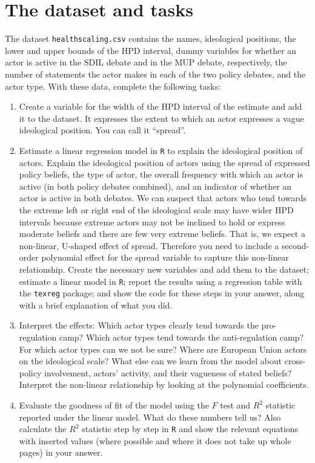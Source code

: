 \documentclass[a4paper,11pt]{article}
\begin{document}
\section*{The dataset and tasks}
The dataset \texttt{healthscaling.csv} contains the names, ideological positions, the lower and upper bounds of the HPD interval, dummy variables for whether an actor is active in the SDIL debate and in the MUP debate, respectively, the number of statements the actor makes in each of the two policy debates, and the actor type. With these data, complete the following tasks:

\begin{enumerate}
 \item Create a variable for the width of the HPD interval of the estimate and add it to the dataset. It expresses the extent to which an actor expresses a vague ideological position. You can call it ``spread''.
 \item Estimate a linear regression model in \texttt{R} to explain the ideological position of actors. Explain the ideological position of actors using the spread of expressed policy beliefs, the type of actor, the overall frequency with which an actor is active (in both policy debates combined), and an indicator of whether an actor is active in both debates. We can suspect that actors who tend towards the extreme left or right end of the ideological scale may have wider HPD intervals because extreme actors may not be inclined to hold or express moderate beliefs and there are few very extreme beliefs. That is, we expect a non-linear, U-shaped effect of spread. Therefore you need to include a second-order polynomial effect for the spread variable to capture this non-linear relationship. Create the necessary new variables and add them to the dataset; estimate a linear model in \texttt{R}; report the results using a regression table with the \texttt{texreg} package; and show the code for these steps in your answer, along with a brief explanation of what you did.
 \item Interpret the effects: Which actor types clearly tend towards the pro-regulation camp? Which actor types tend towards the anti-regulation camp? For which actor types can we not be sure? Where are European Union actors on the ideological scale? What else can we learn from the model about cross-policy involvement, actors' activity, and their vagueness of stated beliefs? Interpret the non-linear relationship by looking at the polynomial coefficients.
 \item Evaluate the goodness of fit of the model using the $F$ test and $R^2$ statistic reported under the linear model. What do these numbers tell us? Also calculate the $R^2$ statistic step by step in \texttt{R} and show the relevant equations with inserted values (where possible and where it does not take up whole pages) in your answer.

\end{enumerate}
\end{document}
